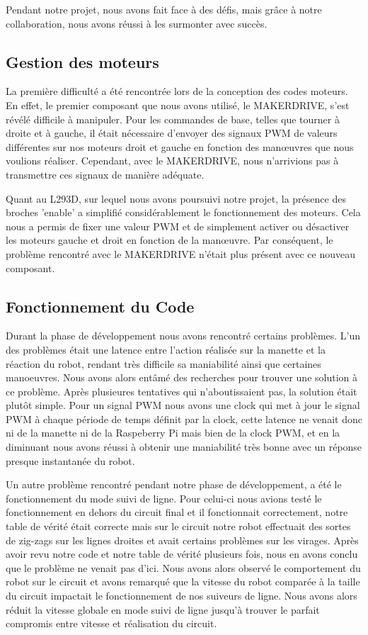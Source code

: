 Pendant notre projet, nous avons fait face à des défis, mais grâce à notre collaboration, nous avons réussi à les surmonter avec succès.

\subsection{Gestion des moteurs}
La première difficulté a été rencontrée lors de la conception des codes moteurs. En effet, le premier composant que nous avons utilisé, le MAKERDRIVE, s'est révélé difficile à manipuler. Pour les commandes de base, telles que tourner à droite et à gauche, il était nécessaire d'envoyer des signaux PWM de valeurs différentes sur nos moteurs droit et gauche en fonction des manœuvres que nous voulions réaliser. Cependant, avec le MAKERDRIVE, nous n'arrivions pas à transmettre ces signaux de manière adéquate.

Quant au L293D, sur lequel nous avons poursuivi notre projet, la présence des broches 'enable' a simplifié considérablement le fonctionnement des moteurs. Cela nous a permis de fixer une valeur PWM et de simplement activer ou désactiver les moteurs gauche et droit en fonction de la manœuvre. Par conséquent, le problème rencontré avec le MAKERDRIVE n'était plus présent avec ce nouveau composant.

\subsection{Fonctionnement du Code}
Durant la phase de développement nous avons rencontré certains problèmes. L'un des problèmes était une latence entre l'action réalisée sur la manette et la réaction du robot, rendant très difficile sa maniabilité ainsi que certaines manoeuvres. Nous avons alors entâmé des recherches pour trouver une solution à ce problème. Après plusieures tentatives qui n'aboutissaient pas, la solution était plutôt simple. Pour un signal PWM nous avons une clock qui met à jour le signal PWM à chaque période de temps définit par la clock, cette latence ne venait donc ni de la manette ni de la Raspeberry Pi mais bien de la clock PWM, et en la diminuant nous avons réussi à obtenir une maniabilité très bonne avec un réponse presque instantanée du robot.

Un autre problème rencontré pendant notre phase de développement, a été le fonctionnement du mode suivi de ligne. Pour celui-ci nous avions testé le fonctionnement en dehors du circuit final et il fonctionnait correctement, notre table de vérité était correcte mais sur le circuit notre robot effectuait des sortes de zig-zags sur les lignes droites et avait certains problèmes sur les virages. Après avoir revu notre code et notre table de vérité plusieurs fois, nous en avons conclu que le problème ne venait pas d'ici. Nous avons alors observé le comportement du robot sur le circuit et avons remarqué que la vitesse du robot comparée à la taille du circuit impactait le fonctionnement de nos suiveurs de ligne. Nous avons alors réduit la vitesse globale en mode suivi de ligne jusqu'à trouver le parfait compromis entre vitesse et réalisation du circuit.

